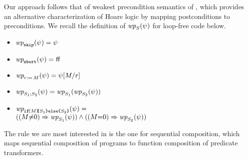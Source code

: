 %   

Our approach follows that of weakest precondition semantics of
\citet{DBLP:journals/cacm/Dijkstra75}, which provides an alternative
characterization of Hoare logic \citep{Hoare:1969:ABC:363235.363259} by
mapping postconditions to preconditions. We recall the definition of
$\fwp{\aCmd}{\bForm}$ for loop-free code below. %
\begin{itemize}
\item
  \begin{math}
    \fwp{\SKIP}{\bForm} = \bForm
  \end{math}
\item 
  \begin{math}
    \fwp{\ABORT}{\bForm} = \FALSE
  \end{math}
\item
  \begin{math}
    \fwp{r\GETS \aExp}{\bForm} = \bForm[\aExp/r]
  \end{math}
\item
  \begin{math}
    \fwp{\aCmd_1;\aCmd_2}{\bForm} = \fwp{\aCmd_1}{\fwp{\aCmd_2}{\bForm}}
  \end{math}
\item
  \begin{math}
    \fwp{\IF{\aExp}\THEN \aCmd_1\ELSE \aCmd_2\FI}{\bForm}= {}
  \end{math}
  \\
  \begin{math}
    ((\aExp{\ne}0) \limplies \fwp{\aCmd_1}{\bForm}) \land
    ((\aExp{=}0) \limplies \fwp{\aCmd_2}{\bForm})
  \end{math}
\end{itemize}
The rule we are most interested
in is the one for sequential composition, which maps sequential composition of programs
to function composition of predicate transformers.

